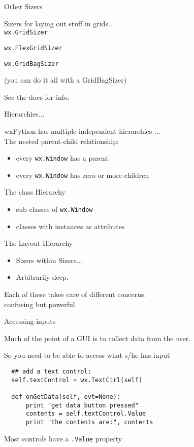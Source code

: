 \documentclass{beamer}
\begin{document}
\begin{frame}[fragile]{Other Sizers}

{\Large Sizers for laying out stuff in grids...}\\

\vfill
{\large \verb`wx.GridSizer`}

\vfill
{\large \verb`wx.FlexGridSizer`}

\vfill
{\large \verb`wx.GridBagSizer`}

\vfill
(you can do it all with a GridBagSizer)

\vfill
See the docs for info.

\end{frame}

\begin{frame}[fragile]{Hierarchies...}

{\Large wxPython has multiple independent hierarchies ...}\\

\vfill
{\large The nested parent-child relationship:}
\begin{itemize}
  \item every \verb`wx.Window` has a parent
  \item every \verb`wx.Window` has zero or more children
\end{itemize}

{\large The class Hierarchy}
\begin{itemize}
  \item sub classes of \verb`wx.Window`
  \item classes with instances as attributes
\end{itemize}

{\large The Layout Hierarchy}
\begin{itemize}
  \item Sizers within Sizers...
  \item Arbitrarily deep.
\end{itemize}

\vfill
{\large Each of these takes care of different concerns:\\
        confusing but powerful}
\end{frame}


\begin{frame}[fragile]{Accessing inputs}

{\Large Much of the point of a GUI is to collect data from the user.}

\vfill
{\large So you need to be able to access what s/he has input}

\begin{verbatim}
  ## add a text control:
  self.textControl = wx.TextCtrl(self)

  def onGetData(self, evt=None):
      print "get data button pressed"
      contents = self.textControl.Value
      print "the contents are:", contents
\end{verbatim}

{\large Most controls have a \verb`.Value` property}

\end{frame}
\end{document}
